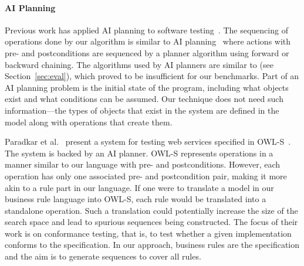 \paragraph*{AI Planning}Previous work has applied AI planning to software
testing~\cite{Scheetz99ai,Howe97testcase}. The sequencing of operations done by
our algorithm is similar to AI planning~\cite{Weld94} where actions with pre-
and postconditions are sequenced by a planner algorithm using forward or
backward chaining. The algorithms used by AI planners are similar to \exhaust{}
(see Section~\ref{sec:eval}), which proved to be insufficient for our
benchmarks. Part of an AI planning problem is the initial state of the program,
including what objects exist and what conditions can be assumed. Our technique
does not need such information---the types of objects that exist in the system
are defined in the model along with operations that create them.

Paradkar et al.~\cite{conf/icws/ParadkarSWJOSL07} present a system for testing
web services specified in OWL-S~\cite{owls}. The system is backed by an AI
planner. OWL-S represents operations in a manner similar to our language with
pre- and postconditions. However, each operation has only one associated pre- and
postcondition pair, making it more akin to a rule part in our language. If one
were to translate a model in our business rule language into OWL-S, each rule
would be translated into a standalone operation. Such a translation could
potentially increase the size of the search space and lead to spurious sequences
being constructed. The focus of their work is on conformance testing, that is,
to test whether a given implementation conforms to the specification. In our
approach, business rules are the specification and the aim is to generate
sequences to cover all rules. %

